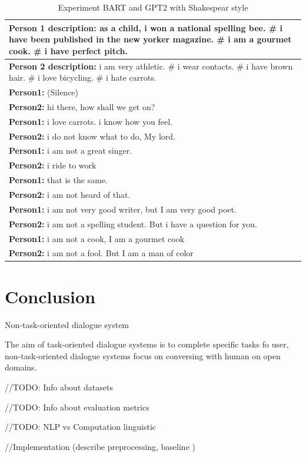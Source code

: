 \begin{table}[ht]
\centering
 \begin{tabular}{|p{14cm}|} 
 \hline\hline
 \textbf{Person 1 description:} as a child, i won a national spelling bee. \# i have been published in the new yorker magazine. \# i am a gourmet cook. \# i have perfect pitch. \\
 \hline
 \textbf{Person 2 description:} i am very athletic. \# i wear contacts. \# i have brown hair. \# i love bicycling. \# i hate carrots. \\
 \hline\hline
 \textbf{Person1:} (Silence) \\
 \textbf{Person2:} hi there, how shall we get on?  \\ 
 \textbf{Person1:} i love carrots. i know how you feel. \\
 \textbf{Person2:} i do not know what to do, My lord. \\
 \textbf{Person1:} i am not a great singer. \\
 \textbf{Person2:} i ride to work \\
 \textbf{Person1:} that is the same. \\
 \textbf{Person2:} i am not heard of that. \\
 \textbf{Person1:} i am not very good writer, but I am very good poet. \\
 \textbf{Person2:} i am not a spelling student. But i have a question for you. \\
 \textbf{Person1:} i am not a cook, I am a gourmet cook \\
 \textbf{Person2:} i am not a fool. But I am a man of color  \\
 \hline\hline
 \end{tabular}
 \caption{Experiment BART and GPT2 with Shakespear style}
\label{tab:poetic_shakespear}
\end{table}

\chapter{Conclusion}

Non-task-oriented dialogue system

The aim of task-oriented dialogue systems is to complete specific tasks fo user, non-task-oriented dialogue systems focus on conversing with human on open domains. 

//TODO: Info about datasets

//TODO: Info about evaluation metrics

//TODO: NLP vs Computation linguistic

//Implementation (describe preprocessing, baseline )
